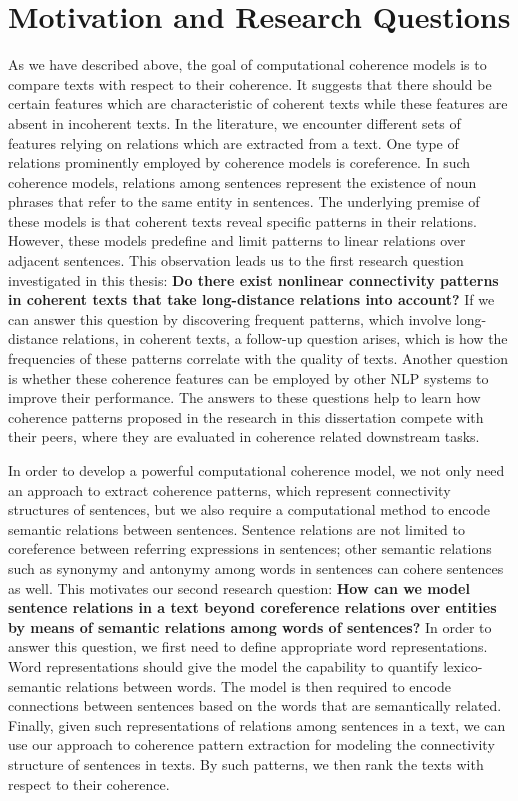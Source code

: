 \section{Motivation and Research Questions}
\label{sec:intro-motivation}

As we have described above, the goal of computational coherence models is to compare texts with respect to their coherence. 
It suggests that there should be certain features which are characteristic of coherent texts while these features are absent in incoherent texts. 
In the literature, we encounter different sets of features relying on relations which are extracted from a text. 
One type of relations prominently employed by coherence models is coreference. 
In such coherence models, relations among sentences represent the existence of noun phrases that refer to the same entity in sentences. 
The underlying premise of these models is that coherent texts reveal specific patterns in their relations. 
However, these models predefine and limit patterns to linear relations over adjacent sentences. 
This observation leads us to the first research question investigated in this thesis: 
\textbf{Do there exist nonlinear connectivity patterns in coherent texts that take long-distance relations into account?} 
If we can answer this question by discovering frequent patterns, which involve long-distance relations, in coherent texts, a follow-up question arises, which is how the frequencies of these patterns correlate with the quality of texts. 
Another question is whether these coherence features can be employed by other NLP systems to improve their performance. 
The answers to these questions help to learn how coherence patterns proposed in the research in this dissertation compete with their peers, where they are evaluated in coherence related downstream tasks. 

In order to develop a powerful computational coherence model, we not only need an approach to extract coherence patterns, which represent connectivity structures of sentences, but we also require a computational method to encode semantic relations between sentences. 
Sentence relations are not limited to coreference between referring expressions in sentences; other semantic relations such as synonymy and antonymy among words in sentences can cohere sentences as well. 
This motivates our second research question: 
\textbf{How can we model sentence relations in a text beyond coreference relations over entities by means of semantic relations among words of sentences?} 
In order to answer this question, we first need to define appropriate word representations.  
Word representations should give the model the capability to quantify lexico-semantic relations between words. 
The model is then required to encode connections between sentences based on the words that are semantically related. 
Finally, given such representations of relations among sentences in a text, we can use our approach to coherence pattern extraction for modeling the connectivity structure of sentences in texts.
By such patterns, we then rank the texts with respect to their coherence. 

